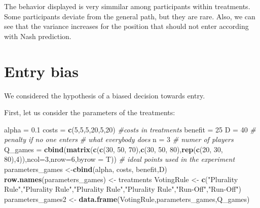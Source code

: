 \documentclass[]{article}
\newenvironment{Shaded}{\begin{snugshade}}{\end{snugshade}}
\newcommand{\KeywordTok}[1]{\textcolor[rgb]{0.13,0.29,0.53}{\textbf{#1}}}
\newcommand{\DataTypeTok}[1]{\textcolor[rgb]{0.13,0.29,0.53}{#1}}
\newcommand{\DecValTok}[1]{\textcolor[rgb]{0.00,0.00,0.81}{#1}}
\newcommand{\FloatTok}[1]{\textcolor[rgb]{0.00,0.00,0.81}{#1}}
\newcommand{\StringTok}[1]{\textcolor[rgb]{0.31,0.60,0.02}{#1}}
\newcommand{\CommentTok}[1]{\textcolor[rgb]{0.56,0.35,0.01}{\textit{#1}}}
\newcommand{\NormalTok}[1]{#1}
\begin{document}
The behavior displayed is very simmilar among participants within
treatments. Some participants deviate from the general path, but they
are rare. Also, we can see that the variance increases for the position
that should not enter according with Nash prediction.

\section{Entry bias}\label{entry-bias}

We considered the hypothesis of a biased decision towards entry.

First, let us consider the parameters of the treatments:

\begin{Shaded}
\begin{Highlighting}[]
\NormalTok{alpha =}\StringTok{ }\FloatTok{0.1} 
\NormalTok{costs =}\StringTok{ }\KeywordTok{c}\NormalTok{(}\DecValTok{5}\NormalTok{,}\DecValTok{5}\NormalTok{,}\DecValTok{5}\NormalTok{,}\DecValTok{20}\NormalTok{,}\DecValTok{5}\NormalTok{,}\DecValTok{20}\NormalTok{) }\CommentTok{#costs in treatments}
\NormalTok{benefit =}\StringTok{ }\DecValTok{25}
\NormalTok{D =}\StringTok{ }\DecValTok{40} \CommentTok{# penalty if no one enters}
\CommentTok{# what everybody does}
\NormalTok{n =}\StringTok{ }\DecValTok{3}         \CommentTok{# numer of players}
\NormalTok{Q_games =}\StringTok{ }\KeywordTok{cbind}\NormalTok{(}\KeywordTok{matrix}\NormalTok{(}\KeywordTok{c}\NormalTok{(}\KeywordTok{c}\NormalTok{(}\DecValTok{30}\NormalTok{, }\DecValTok{50}\NormalTok{, }\DecValTok{70}\NormalTok{),}\KeywordTok{c}\NormalTok{(}\DecValTok{30}\NormalTok{, }\DecValTok{50}\NormalTok{, }\DecValTok{80}\NormalTok{),}\KeywordTok{rep}\NormalTok{(}\KeywordTok{c}\NormalTok{(}\DecValTok{20}\NormalTok{, }\DecValTok{30}\NormalTok{, }\DecValTok{80}\NormalTok{),}\DecValTok{4}\NormalTok{)),}\DataTypeTok{ncol=}\DecValTok{3}\NormalTok{,}\DataTypeTok{nrow=}\DecValTok{6}\NormalTok{,}\DataTypeTok{byrow =}\NormalTok{ T))  }\CommentTok{# ideal points used in the experiment}
\NormalTok{parameters_games <-}\KeywordTok{cbind}\NormalTok{(alpha, costs, benefit,D)}
\KeywordTok{row.names}\NormalTok{(parameters_games) <-}\StringTok{ }\NormalTok{treatments}
\NormalTok{VotingRule <-}\StringTok{ }\KeywordTok{c}\NormalTok{(}\StringTok{"Plurality Rule"}\NormalTok{,}\StringTok{"Plurality Rule"}\NormalTok{,}\StringTok{"Plurality Rule"}\NormalTok{,}\StringTok{"Plurality Rule"}\NormalTok{,}\StringTok{"Run-Off"}\NormalTok{,}\StringTok{"Run-Off"}\NormalTok{)}
\NormalTok{parameters_games2 <-}\StringTok{ }\KeywordTok{data.frame}\NormalTok{(VotingRule,parameters_games,Q_games)}

\end{Highlighting}
\end{Shaded}
\end{document}
